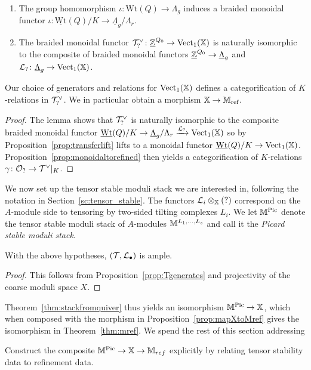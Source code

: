 \documentclass[12pt]{amsart}
\begin{document}
\begin{lemma}  \label{lem:iotafacts}
\begin{enumerate}
\item The group homomorphism $\iota\colon \text{Wt}(Q) \to \Lambda_g$ induces a braided monoidal functor $\iota \colon \underline{\text{Wt}}(Q)/K \to \underline{\Lambda}_g/\Lambda_r$. \item The braided monoidal functor $\mathcal{T}^{\vee}_? \colon \underline{\mathbb{Z}}^{Q_0} \to \operatorname{Vect}_1(\mathbb{X})$ is naturally isomorphic to the composite of braided monoidal functors $\underline{\mathbb{Z}}^{Q_0} \to \underline{\Lambda}_g$ and  $\mathcal{L}_?\colon \underline{\Lambda}_g \to \operatorname{Vect}_1(\mathbb{X})$.
\end{enumerate}
\end{lemma}
\begin{proposition} \label{prop:mapXtoMref}
Our choice of generators and relations for $\operatorname{Vect}_1(\mathbb{X})$ defines a categorification of $K$-relations in $\mathcal{T}^{\vee}_?$. We in particular obtain a morphism $\mathbb{X} \to \mathbb{M}_{\textup{ref}}$.
\end{proposition}
\begin{proof}
The lemma shows that $\mathcal{T}^{\vee}_?$ is naturally isomorphic to the composite braided monoidal functor $\underline{\text{Wt}}(Q)/K \to \underline{\Lambda}_g/\Lambda_r \xrightarrow{\mathcal{L}_?} \operatorname{Vect}_1(\mathbb{X})$ so by Proposition~\ref{prop:transferlift} lifts to a monoidal functor $\underline{\text{Wt}}(Q)/K \to \operatorname{Vect}_1(\mathbb{X})$. 
Proposition~\ref{prop:monoidaltorefined} then yields a categorification of $K$-relations $\gamma \colon \mathcal{O}_? \to \mathcal{T}^{\vee}|_K$. 
\end{proof}

We now set up the tensor stable moduli stack we are interested in, following the notation in Section~\ref{sc:tensor_stable}. The functors $\mathcal{L}_i \otimes_{\mathbb{X}} (?)$ correspond on the $A$-module side to tensoring by two-sided tilting complexes $L_i$. We let $\mathbb{M}^{\operatorname{Pic}}$ denote the tensor stable moduli stack of $A$-modules $\mathbb{M}^{L_1,\ldots,L_s}$ and call it the {\em Picard stable moduli stack}. 


\begin{proposition}  \label{prop:Picis ample}
With the above hypotheses, $(\mathcal{T},\mathcal{L}_{\bullet})$ is ample.
\end{proposition}
\begin{proof}
This follows from Proposition~\ref{prop:Tgenerates} and projectivity of the coarse moduli space $X$.
\end{proof}
Theorem~\ref{thm:stackfromquiver} thus yields an isomorphism $\mathbb{M}^{\operatorname{Pic}} \to \mathbb{X}$, which when composed with the morphism in Proposition~\ref{prop:mapXtoMref} gives the isomorphism in Theorem~\ref{thm:mref}. We spend the rest of this section addressing 
\begin{problem}
Construct the composite $\mathbb{M}^{\operatorname{Pic}} \to \mathbb{X} \to \mathbb{M}_{ref}$ explicitly by relating tensor stability data to refinement data. 
\end{problem}
\end{document}
